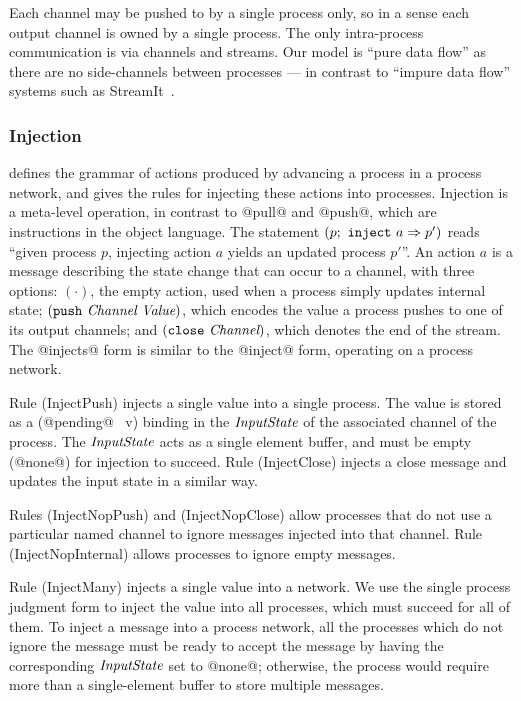 Each channel may be pushed to by a single process only, so in a sense each output channel is owned by a single process.
The only intra-process communication is via channels and streams.
Our model is ``pure data flow'' as there are no side-channels between processes --- in contrast to ``impure data flow'' systems such as StreamIt~\cite{thies2002streamit}.



\subsubsection{Injection}
 defines the grammar of actions produced by advancing a process in a process network, and gives the rules for injecting these actions into processes.
Injection is a meta-level operation, in contrast to @pull@ and @push@, which are instructions in the object language.
The statement $(p;~\texttt{inject}~a \Rightarrow p')$ reads ``given process $p$, injecting action $a$ yields an updated process $p'$''.
An action $a$ is a message describing the state change that can occur to a channel, with three options: $(\cdot)$, the empty action, used when a process simply updates internal state; $(\texttt{push}~\textit{Channel}~\textit{Value})$, which encodes the value a process pushes to one of its output channels; and $(\texttt{close}~\textit{Channel})$, which denotes the end of the stream.
The @injects@ form is similar to the @inject@ form, operating on a process network.

Rule (InjectPush) injects a single value into a single process. The value is stored as a (@pending@~ v) binding in the $\textit{InputState}$ of the associated channel of the process. The $\textit{InputState}$ acts as a single element buffer, and must be empty (@none@) for injection to succeed.
Rule (InjectClose) injects a close message and updates the input state in a similar way.

Rules (InjectNopPush) and (InjectNopClose) allow processes that do not use a particular named channel to ignore messages injected into that channel.
Rule (InjectNopInternal) allows processes to ignore empty messages.

Rule (InjectMany) injects a single value into a network.
We use the single process judgment form to inject the value into all processes, which must succeed for all of them.
To inject a message into a process network, all the processes which do not ignore the message must be ready to accept the message by having the corresponding $\textit{InputState}$ set to @none@; otherwise, the process would require more than a single-element buffer to store multiple messages.


